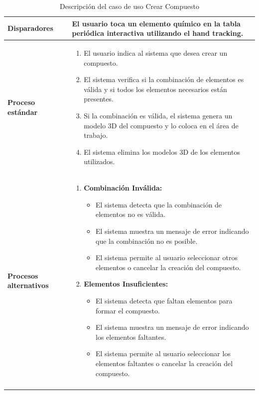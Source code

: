 \begin{longtable}{>{\raggedright\arraybackslash}m{} >{\raggedright\arraybackslash}m{}}
    \textbf{Disparadores} & El usuario toca un elemento químico en la tabla periódica interactiva utilizando el hand tracking.\\
    \midrule
    \textbf{Proceso estándar} &
    \begin{enumerate}
        \item El usuario indica al sistema que desea crear un compuesto. 
        \item El sistema verifica si la combinación de elementos es válida y si todos los elementos necesarios están presentes. 
        \item Si la combinación es válida, el sistema genera un modelo 3D del compuesto y lo coloca en el área de trabajo. 
        \item El sistema elimina los modelos 3D de los elementos utilizados.  
    \end{enumerate} \\
    \midrule
    \textbf{Procesos alternativos} & 
    \begin{enumerate}[{2}A. ]
        \item \textbf{Combinación Inválida: }
        \begin{itemize}
            \item El sistema detecta que la combinación de elementos no es válida. 
            \item El sistema muestra un mensaje de error indicando que la combinación no es posible. 
            \item El sistema permite al usuario seleccionar otros elementos o cancelar la creación del compuesto.
        \end{itemize}
        \item \textbf{Elementos Insuficientes: }
        \begin{itemize}
            \item El sistema detecta que faltan elementos para formar el compuesto. 
            \item El sistema muestra un mensaje de error indicando los elementos faltantes. 
            \item El sistema permite al usuario seleccionar los elementos faltantes o cancelar la creación del compuesto. 
        \end{itemize}      
    \end{enumerate}\\
    \midrule
    \caption{Descripción del caso de uso Crear Compuesto}
    \label{tab:Caso_de_uso_ Balancear_Crear_Compuesto}
\end{longtable}

